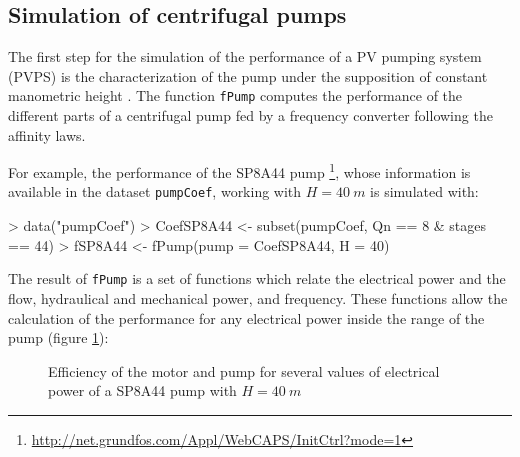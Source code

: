 \documentclass[a4paper]{article}
\renewenvironment{Schunk}{\vspace{\topsep}}{\vspace{\topsep}}
\newcommand{\code}[1]{{\texttt{#1}}}
\begin{document}
\subsection{Simulation of centrifugal pumps}

The first step for the simulation of the performance of a PV pumping
system (PVPS) is the characterization of the pump under the
supposition of constant manometric height
\cite{Abella.Lorenzo.ea2003}. The function \code{fPump} computes the
performance of the different parts of a centrifugal pump fed by a
frequency converter following the affinity laws.

For example, the performance of the SP8A44 pump
\footnote{\url{http://net.grundfos.com/Appl/WebCAPS/InitCtrl?mode=1}},
whose information is available in the dataset \code{pumpCoef}, working
with $H=\SI{40}{m}$ is simulated with:

\begin{Schunk}
\begin{Sinput}
> data("pumpCoef")
> CoefSP8A44 <- subset(pumpCoef, Qn == 8 & stages == 44)
> fSP8A44 <- fPump(pump = CoefSP8A44, H = 40)
\end{Sinput}
\end{Schunk}

The result of \code{fPump} is a set of functions which relate the
electrical power and the flow, hydraulical and mechanical power, and
frequency.  These functions allow the calculation of the performance
for any electrical power inside the range of the pump (figure
\ref{fig:EficienciaMotobomba}):

\begin{Schunk}
\end{Schunk}


\begin{figure}
\centering

\caption{Efficiency of the motor and pump for several values of
  electrical power of a SP8A44 pump with
  $H=\SI{40}{m}$\label{fig:EficienciaMotobomba}}

\end{figure}
\end{document}
